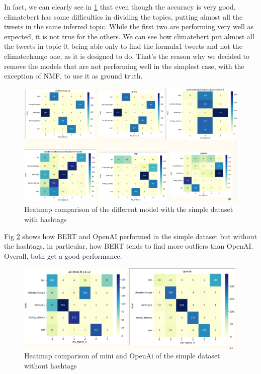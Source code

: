 In fact, we can clearly see in \ref{figure:sup_heatmap1_simple_hash} that even though the accuracy is very good, climatebert has some difficulties in dividing the topics, putting almost all the tweets in the same inferred topic. While the first two are performing very well as expected, it is not true for the others. We can see how climatebert put almost all the tweets in topic 0, being able only to find the formula1 tweets and not the climatechange one, as it is designed to do.
That's the reason why we decided to remove the models that are not performing well in the simplest case, with the exception of NMF, to use it as ground truth. 


\begin{figure}[h]
    \centering %
        \includegraphics[width=0.99\linewidth]{Chapter4/figures/topic_heatmap1.png} 
    \caption{Heatmap comparison of the different model with the simple dataset with hashtags
    }
    \label{figure:sup_heatmap1_simple_hash} %
\end{figure}

Fig \ref{figure:supervised heatmap1} shows how BERT and OpenAI performed in the simple dataset but without the hashtags, in particular, how BERT tends to find more outliers than OpenAI. Overall, both get a good performance.


\begin{figure}[h]
    \centering %
        \includegraphics[width=0.99\linewidth]{Chapter4/figures/topic_heatmap_bertopic.png} 
    \caption{Heatmap comparison of mini and OpenAi of the simple dataset without hashtags}
    \label{figure:supervised heatmap1} %
\end{figure}

